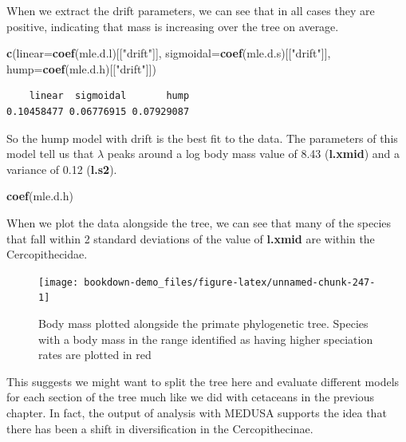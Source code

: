 \documentclass[
]{book}
\newenvironment{Shaded}{\begin{snugshade}}{\end{snugshade}}
\newcommand{\DataTypeTok}[1]{\textcolor[rgb]{0.13,0.29,0.53}{#1}}
\newcommand{\KeywordTok}[1]{\textcolor[rgb]{0.13,0.29,0.53}{\textbf{#1}}}
\newcommand{\NormalTok}[1]{#1}
\newcommand{\StringTok}[1]{\textcolor[rgb]{0.31,0.60,0.02}{#1}}
\begin{document}
When we extract the drift parameters, we can see that in all cases they are positive, indicating that mass is increasing over the tree on average.

\begin{Shaded}
\begin{Highlighting}[]
\KeywordTok{c}\NormalTok{(}\DataTypeTok{linear=}\KeywordTok{coef}\NormalTok{(mle.d.l)[[}\StringTok{"drift"}\NormalTok{]], }
  \DataTypeTok{sigmoidal=}\KeywordTok{coef}\NormalTok{(mle.d.s)[[}\StringTok{"drift"}\NormalTok{]], }
  \DataTypeTok{hump=}\KeywordTok{coef}\NormalTok{(mle.d.h)[[}\StringTok{"drift"}\NormalTok{]])}
\end{Highlighting}
\end{Shaded}

\begin{verbatim}
    linear  sigmoidal       hump 
0.10458477 0.06776915 0.07929087 
\end{verbatim}

So the hump model with drift is the best fit to the data. The parameters of this model tell us that \(\lambda\) peaks around a log body mass value of 8.43 (\textbf{l.xmid}) and a variance of 0.12 (\textbf{l.s2}).

\begin{Shaded}
\begin{Highlighting}[]
\KeywordTok{coef}\NormalTok{(mle.d.h)}
\end{Highlighting}
\end{Shaded}

When we plot the data alongside the tree, we can see that many of the species that fall within 2 standard deviations of the value of \textbf{l.xmid} are within the Cercopithecidae.

\begin{figure}[H]

{\centering \texttt{[image: bookdown-demo\_files/figure-latex/unnamed-chunk-247-1]} 

}

\caption{Body mass plotted alongside the primate phylogenetic tree. Species with a body mass in the range identified as having higher speciation rates are plotted in red}\label{fig:unnamed-chunk-247}
\end{figure}

This suggests we might want to split the tree here and evaluate different models for each section of the tree much like we did with cetaceans in the previous chapter. In fact, the output of analysis with MEDUSA supports the idea that there has been a shift in diversification in the Cercopithecinae.
\end{document}
